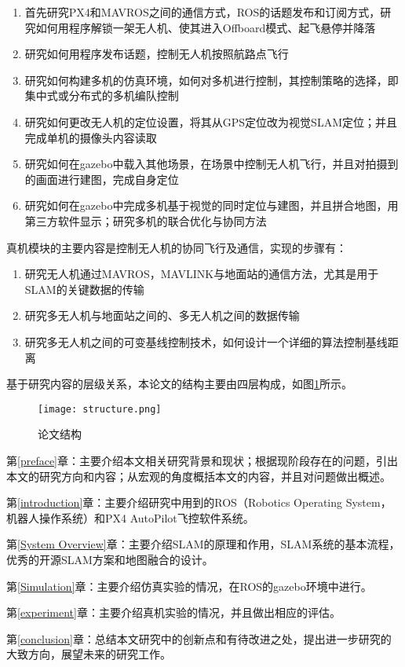 \begin{enumerate}
	\item 首先研究PX4和MAVROS之间的通信方式，ROS的话题发布和订阅方式，研究如何用程序解锁一架无人机、使其进入Offboard模式、起飞悬停并降落
	\item 研究如何用程序发布话题，控制无人机按照航路点飞行
	\item 研究如何构建多机的仿真环境，如何对多机进行控制，其控制策略的选择，即集中式或分布式的多机编队控制
	\item 研究如何更改无人机的定位设置，将其从GPS定位改为视觉SLAM定位；并且完成单机的摄像头内容读取
	\item 研究如何在gazebo中载入其他场景，在场景中控制无人机飞行，并且对拍摄到的画面进行建图，完成自身定位
	\item 研究如何在gazebo中完成多机基于视觉的同时定位与建图，并且拼合地图，用第三方软件显示；研究多机的联合优化与协同方法
\end{enumerate}

真机模块的主要内容是控制无人机的协同飞行及通信，实现的步骤有：

\begin{enumerate}
	\item 研究无人机通过MAVROS，MAVLINK与地面站的通信方法，尤其是用于SLAM的关键数据的传输
	\item 研究多无人机与地面站之间的、多无人机之间的数据传输
	\item 研究多无人机之间的可变基线控制技术，如何设计一个详细的算法控制基线距离
\end{enumerate}

基于研究内容的层级关系，本论文的结构主要由四层构成，如图\ref{fig1}所示。
\vspace{10pt}
\begin{figure}[!ht]
\centering
\texttt{[image: structure.png]}
\caption{论文结构 }
\label{fig1}
\end{figure}


第\ref{preface}章：主要介绍本文相关研究背景和现状；根据现阶段存在的问题，引出本文的研究方向和内容；从宏观的角度概括本文的内容，并且对问题做出概述。

第\ref{introduction}章：主要介绍研究中用到的ROS（Robotics Operating System，机器人操作系统）和PX4 AutoPilot飞控软件系统。

第\ref{System Overview}章：主要介绍SLAM的原理和作用，SLAM系统的基本流程，优秀的开源SLAM方案和地图融合的设计。

第\ref{Simulation}章：主要介绍仿真实验的情况，在ROS的gazebo环境中进行。

第\ref{experiment}章：主要介绍真机实验的情况，并且做出相应的评估。

第\ref{conclusion}章：总结本文研究中的创新点和有待改进之处，提出进一步研究的大致方向，展望未来的研究工作。

